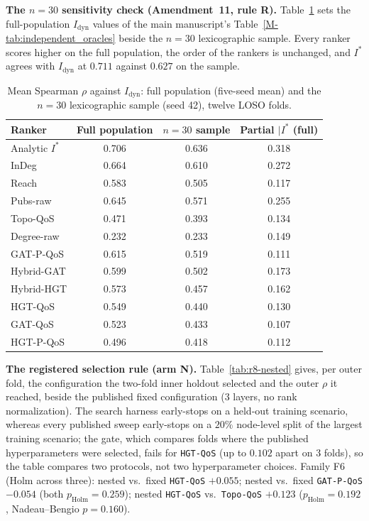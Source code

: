 \noindent\textbf{The $n = 30$ sensitivity check (Amendment~11, rule R).} Table~\ref{tab:r8-n30} sets the full-population $I_{\text{dyn}}$ values of the main manuscript's Table~\ref{M-tab:independent_oracles} beside the $n = 30$ lexicographic sample. Every ranker scores higher on the full population, the order of the rankers is unchanged, and $I^*$ agrees with $I_{\text{dyn}}$ at $0.711$ against $0.627$ on the sample.

\begin{table}[htbp]
\centering
\scriptsize
\caption{Mean Spearman $\rho$ against $I_{\text{dyn}}$: full population (five-seed mean) and the $n = 30$ lexicographic sample (seed 42), twelve LOSO folds.}
\label{tab:r8-n30}
\begin{tabular}{lccc}
\toprule
Ranker & Full population & $n = 30$ sample & Partial $\mid I^*$ (full) \\
\midrule
Analytic $I^*$ & 0.706 & 0.636 & 0.318 \\
InDeg & 0.664 & 0.610 & 0.272 \\
Reach & 0.583 & 0.505 & 0.117 \\
Pubs-raw & 0.645 & 0.571 & 0.255 \\
Topo-QoS & 0.471 & 0.393 & 0.134 \\
Degree-raw & 0.232 & 0.233 & 0.149 \\
GAT-P-QoS & 0.615 & 0.519 & 0.111 \\
Hybrid-GAT & 0.599 & 0.502 & 0.173 \\
Hybrid-HGT & 0.573 & 0.457 & 0.162 \\
HGT-QoS & 0.549 & 0.440 & 0.130 \\
GAT-QoS & 0.523 & 0.433 & 0.107 \\
HGT-P-QoS & 0.496 & 0.418 & 0.112 \\
\bottomrule
\end{tabular}
\end{table}

\noindent\textbf{The registered selection rule (arm N).} Table~\ref{tab:r8-nested} gives, per outer fold, the configuration the two-fold inner holdout selected and the outer $\rho$ it reached, beside the published fixed configuration (3 layers, no rank normalization). The search harness early-stops on a held-out training scenario, whereas every published sweep early-stops on a $20\%$ node-level split of the largest training scenario; the gate, which compares folds where the published hyperparameters were selected, fails for \texttt{HGT-QoS} (up to $0.102$ apart on 3 folds), so the table compares two protocols, not two hyperparameter choices. Family F6 (Holm across three): nested vs.\ fixed \texttt{HGT-QoS} $+0.055$; nested vs.\ fixed \texttt{GAT-P-QoS} $-0.054$ (both $p_{\text{Holm}} = 0.259$); nested \texttt{HGT-QoS} vs.\ \texttt{Topo-QoS} $+0.123$ ($p_{\text{Holm}} = 0.192$, Nadeau--Bengio $p = 0.160$).


